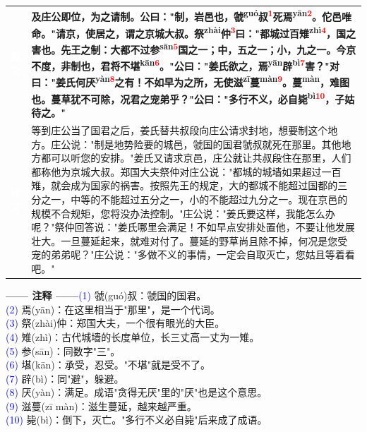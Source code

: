 \documentclass[a4paper,12pt]{ctexart}
\makeatletter
\newcommand{\ruby}[2]{#1\textsuperscript{#2}}
\newlength{\colA}\setlength{\colA}{0.06\textwidth}
\newlength{\colB}\setlength{\colB}{0.64\textwidth}
\newlength{\colC}\setlength{\colC}{0.26\textwidth}
\newcommand{\sectab}[3]{%
  \noindent
  \begin{minipage}[c]{\dimexpr\colA+\colB+2\tabcolsep\relax}
  \begin{tabular}{@{}p{\colA}p{\colB}@{}}
  \sideyuan  & {\large\bfseries #1} \\
  \sideyiwen & {\large #2} \\
  \end{tabular}
  \end{minipage}
  \hfill
  \begin{minipage}[c]{\colC}
  {\labelann\vspace{0.1cm}}#3
  \end{minipage}
  \par
}
\newcommand{\sideyuan}{\colorbox{blue!70!black}{\textcolor{white}{\normalsize\textbf{原文}}}}
\newcommand{\sideyiwen}{\colorbox{green!60!black}{\textcolor{white}{\normalsize\textbf{译文}}}}
\newcommand{\labelann}{\textcolor{orange!80!black}{\small\textbf{—— 注释 ——}}}
\newcommand{\refmark}[1]{\textsuperscript{\textcolor{red}{#1}}}
\makeatother
\begin{document}
\vspace{0.3cm}
\sectab{及庄公即位，为之请制。公曰："制，岩邑也，\ruby{虢}{guó}叔\refmark{1}死\ruby{焉}{yān}\refmark{2}。佗邑唯命。"请京，使居之，谓之京城大叔。\ruby{祭}{zhài}仲\refmark{3}曰："都城过百\ruby{雉}{zhì}\refmark{4}，国之害也。先王之制：大都不过\ruby{参}{sān}\refmark{5}国之一；中，五之一；小，九之一。今京不度，非制也，君将不\ruby{堪}{kān}\refmark{6}。"公曰："姜氏欲之，\ruby{焉}{yān}\ruby{辟}{bì}\refmark{7}害？"对曰："姜氏何\ruby{厌}{yàn}\refmark{8}之有！不如早为之所，无使\ruby{滋}{zī}\ruby{蔓}{màn}\refmark{9}。\ruby{蔓}{màn}，难图也。蔓草犹不可除，况君之宠弟乎？"公曰："多行不义，必自\ruby{毙}{bì}\refmark{10}，子姑待之。"}{等到庄公当了国君之后，姜氏替共叔段向庄公请求封地，想要制这个地方。庄公说："制是地势险要的城邑，虢国的国君虢叔就死在那里。其他地方都可以听您的安排。"姜氏又请求京邑，庄公就让共叔段住在那里，人们都称他为京城大叔。郑国大夫祭仲对庄公说："都城的城墙如果超过一百雉，就会成为国家的祸害。按照先王的规定，大的都城不能超过国都的三分之一，中等的不能超过五分之一，小的不能超过九分之一。现在京邑的规模不合规矩，您将没办法控制。"庄公说："姜氏要这样，我能怎么办呢？"祭仲回答说："姜氏哪里会满足！不如早点安排处置他，不要让他发展壮大。一旦蔓延起来，就难对付了。蔓延的野草尚且除不掉，何况是您受宠的弟弟呢？"庄公说："多做不义的事情，一定会自取灭亡，您姑且等着看吧。"}{{\small \textcolor{blue}{(1)} 虢(guó)叔：虢国的国君。}\\[0.1cm]{\small \textcolor{blue}{(2)} 焉(yān)：在这里相当于"那里"，是一个代词。}\\[0.1cm]{\small \textcolor{blue}{(3)} 祭(zhài)仲：郑国大夫，一个很有眼光的大臣。}\\[0.1cm]{\small \textcolor{blue}{(4)} 雉(zhì)：古代城墙的长度单位，长三丈高一丈为一雉。}\\[0.1cm]{\small \textcolor{blue}{(5)} 参(sān)：同数字"三"。}\\[0.1cm]{\small \textcolor{blue}{(6)} 堪(kān)：承受，忍受。"不堪"就是受不了。}\\[0.1cm]{\small \textcolor{blue}{(7)} 辟(bì)：同"避"，躲避。}\\[0.1cm]{\small \textcolor{blue}{(8)} 厌(yàn)：满足。成语"贪得无厌"里的"厌"也是这个意思。}\\[0.1cm]{\small \textcolor{blue}{(9)} 滋蔓(zī màn)：滋生蔓延，越来越严重。}\\[0.1cm]{\small \textcolor{blue}{(10)} 毙(bì)：倒下，灭亡。"多行不义必自毙"后来成了成语。}}
\end{document}
